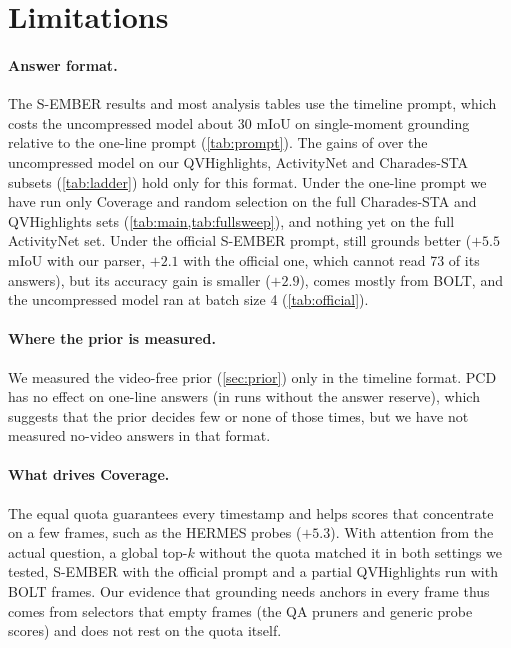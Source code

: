 \section{Limitations}
\label{sec:limitations}

\paragraph{Answer format.}
The S-EMBER results and most analysis tables use the timeline prompt, which costs the uncompressed model about 30
mIoU on single-moment grounding relative to the one-line prompt (\cref{tab:prompt}). The gains of \method over the
uncompressed model on our QVHighlights, ActivityNet and Charades-STA subsets (\cref{tab:ladder}) hold only for this
format. Under the one-line prompt we have run only Coverage and random selection on the full Charades-STA and
QVHighlights sets (\cref{tab:main,tab:fullsweep}), and nothing yet on the full ActivityNet set. Under the official
S-EMBER prompt, \method still grounds better ($+5.5$ mIoU with our parser, $+2.1$ with the official one, which cannot
read 73 of its answers), but its accuracy gain is smaller ($+2.9$), comes mostly from BOLT, and the uncompressed
model ran at batch size 4  (\cref{tab:official}). 

\paragraph{Where the prior is measured.}
We measured the video-free prior (\cref{sec:prior}) only in the timeline format. PCD has no effect on one-line
answers (in runs without the answer reserve), which suggests that the prior decides few or none of those times, but
we have not measured no-video answers in that format. 

\paragraph{What drives Coverage.}
The equal quota guarantees every timestamp and helps scores that concentrate on a few frames, such as the HERMES
probes ($+5.3$). With attention from the actual question, a global top-$k$ without the quota matched it in both
settings we tested, S-EMBER with the official prompt and a partial QVHighlights run with BOLT frames. Our evidence
that grounding needs anchors in every frame thus comes from selectors that empty frames (the QA pruners and generic
probe scores) and does not rest on the quota itself. 

